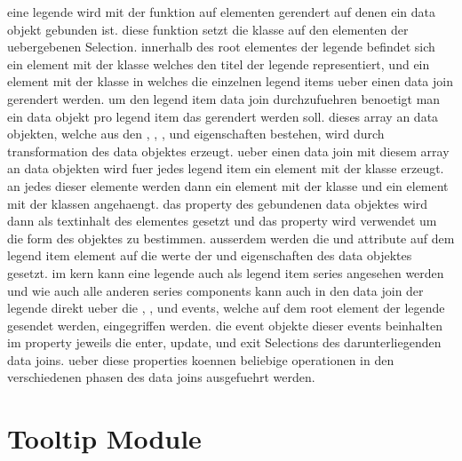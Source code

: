 eine legende wird mit der  funktion auf elementen gerendert auf denen ein  data objekt gebunden ist.
diese funktion setzt die  klasse auf den elementen der uebergebenen Selection.
innerhalb des root elementes der legende befindet sich ein  element mit der  klasse welches den titel der legende representiert, und ein  element mit der  klasse in welches die einzelnen legend items ueber einen data join gerendert werden.
um den legend item data join durchzufuehren benoetigt man ein data objekt pro legend item das gerendert werden soll.
dieses array an  data objekten, welche aus den , , , und  eigenschaften bestehen, wird durch transformation des  data objektes erzeugt.
ueber einen data join mit diesem array an data objekten wird fuer jedes legend item ein  element mit der  klasse erzeugt.
an jedes dieser  elemente werden dann ein  element mit der  klasse und ein  element mit der  klassen angehaengt.
das  property des gebundenen  data objektes wird dann als textinhalt des  elementes gesetzt und das  property wird verwendet um die form des  objektes zu bestimmen.
ausserdem werden die  und  attribute auf dem  legend item element auf die werte der  und  eigenschaften des data objektes gesetzt.
im kern kann eine legende auch als legend item series angesehen werden und wie auch alle anderen series components kann auch in den data join der legende direkt ueber die , , und  events, welche auf dem root element der legende gesendet werden, eingegriffen werden.
die event objekte dieser events beinhalten im  property jeweils die enter, update, und exit Selections des darunterliegenden data joins.
ueber diese properties koennen beliebige operationen in den verschiedenen phasen des data joins ausgefuehrt werden.






\section{Tooltip Module}
\label{sec:TooltipModule}

